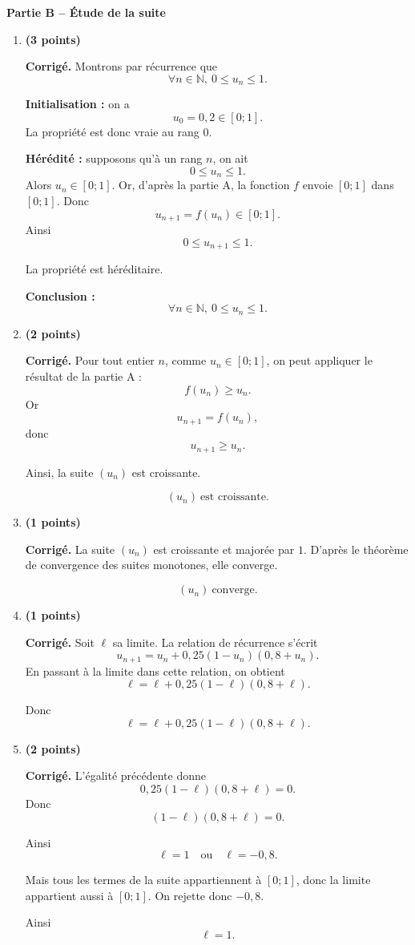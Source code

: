 \documentclass[11pt,a4paper]{article}
\newcommand{\N}{\mathbb{N}}
\newcommand{\bareme}[1]{\hfill{\color{blue!70!black}\textbf{(#1 points)}}}
\newcommand{\corr}{\noindent\textcolor{blue!70!black}{\textbf{Corrigé. }}}
\begin{document}
\textbf{Partie B -- Étude de la suite}

\begin{enumerate}[label=\textbf{B.\arabic*.}, leftmargin=0.9cm]

\item \bareme{3}

\corr Montrons par récurrence que
\[
\forall n\in\N,\ 0\leq u_n\leq 1.
\]

\textbf{Initialisation :} on a
\[
u_0=0{,}2\in[0;1].
\]
La propriété est donc vraie au rang $0$.

\textbf{Hérédité :} supposons qu’à un rang $n$, on ait
\[
0\leq u_n\leq 1.
\]
Alors $u_n\in[0;1]$. Or, d’après la partie A, la fonction $f$ envoie $[0;1]$ dans $[0;1]$.
Donc
\[
u_{n+1}=f(u_n)\in[0;1].
\]
Ainsi
\[
0\leq u_{n+1}\leq 1.
\]

La propriété est héréditaire.

\textbf{Conclusion :}
\[
\boxed{\forall n\in\N,\ 0\leq u_n\leq 1.}
\]

\item \bareme{2}

\corr Pour tout entier $n$, comme $u_n\in[0;1]$, on peut appliquer le résultat de la partie A :
\[
f(u_n)\geq u_n.
\]
Or
\[
u_{n+1}=f(u_n),
\]
donc
\[
u_{n+1}\geq u_n.
\]

Ainsi, la suite $(u_n)$ est croissante.

\[
\boxed{(u_n)\ \text{est croissante}.}
\]

\item \bareme{1}

\corr La suite $(u_n)$ est croissante et majorée par $1$. D’après le théorème de convergence des suites monotones, elle converge.

\[
\boxed{(u_n)\ \text{converge}.}
\]

\item \bareme{1}

\corr Soit $\ell$ sa limite. La relation de récurrence s’écrit
\[
u_{n+1}=u_n+0{,}25(1-u_n)(0{,}8+u_n).
\]
En passant à la limite dans cette relation, on obtient
\[
\ell=\ell+0{,}25(1-\ell)(0{,}8+\ell).
\]

Donc
\[
\boxed{\ell=\ell+0{,}25(1-\ell)(0{,}8+\ell).}
\]

\item \bareme{2}

\corr L’égalité précédente donne
\[
0{,}25(1-\ell)(0{,}8+\ell)=0.
\]
Donc
\[
(1-\ell)(0{,}8+\ell)=0.
\]

Ainsi
\[
\ell=1
\quad \text{ou} \quad
\ell=-0{,}8.
\]

Mais tous les termes de la suite appartiennent à $[0;1]$, donc la limite appartient aussi à $[0;1]$. On rejette donc $-0{,}8$.

Ainsi
\[
\boxed{\ell=1.}
\]

\end{enumerate}
\end{document}
